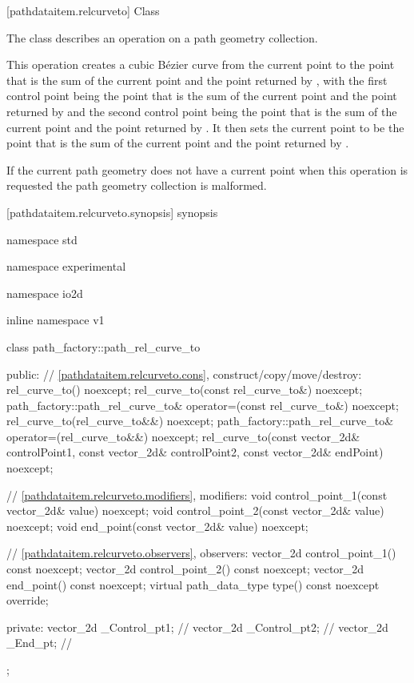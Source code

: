  [pathdataitem.relcurveto] {Class }

\pnum
{}
The class  describes an operation on a path geometry collection.

\pnum
This operation creates a cubic B\'ezier curve from the current point to the point that is the sum of the current point and the point returned by , with the first control point being the point that is the sum of the current point and the point returned by  and the second control point being the point that is the sum of the current point and the point returned by . It then sets the current point to be the point that is the sum of the current point and the point returned by .

\pnum
If the current path geometry does not have a current point when this operation is requested the path geometry collection is malformed.

 [pathdataitem.relcurveto.synopsis] { synopsis}

\begin{codeblock}
namespace std { namespace experimental { namespace io2d { inline namespace v1 {
  class path_factory::path_rel_curve_to {
  public:
    // \ref{pathdataitem.relcurveto.cons}, construct/copy/move/destroy:
    rel_curve_to() noexcept;
    rel_curve_to(const rel_curve_to&) noexcept;
    path_factory::path_rel_curve_to& operator=(const rel_curve_to&) noexcept;
    rel_curve_to(rel_curve_to&&) noexcept;
    path_factory::path_rel_curve_to& operator=(rel_curve_to&&) noexcept;
    rel_curve_to(const vector_2d& controlPoint1, const vector_2d& controlPoint2,
      const vector_2d& endPoint) noexcept;

    // \ref{pathdataitem.relcurveto.modifiers}, modifiers:
    void control_point_1(const vector_2d& value) noexcept;
    void control_point_2(const vector_2d& value) noexcept;
    void end_point(const vector_2d& value) noexcept;

    // \ref{pathdataitem.relcurveto.observers}, observers:
    vector_2d control_point_1() const noexcept;
    vector_2d control_point_2() const noexcept;
    vector_2d end_point() const noexcept;
    virtual path_data_type type() const noexcept override;
    
  private:
    vector_2d _Control_pt1; // \expos
    vector_2d _Control_pt2; // \expos
    vector_2d _End_pt;      // \expos
  };
} } } }
\end{codeblock}

